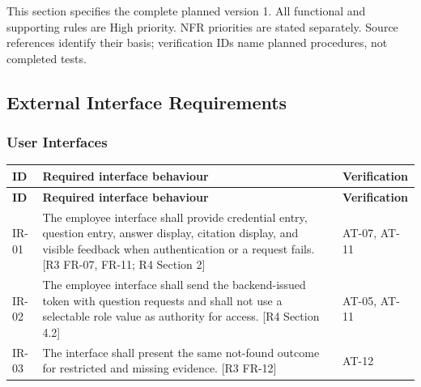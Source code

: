 \documentclass[11pt,letterpaper]{article}
\begin{document}
This section specifies the complete planned version 1. All functional and supporting rules are High priority. NFR priorities are stated separately. Source references identify their basis; verification IDs name planned procedures, not completed tests.\par

\subsection{External Interface Requirements}

\subsubsection{User Interfaces}

\begingroup\small

\begin{longtable}{|P{\arrayrulewidth\relax}|P{\arrayrulewidth\relax}|P{\arrayrulewidth\relax}|}

\hline{}

\textbf{ID} & \textbf{Required interface behaviour} & \textbf{Verification} \\ \hline

\endfirsthead

\hline{}

\textbf{ID} & \textbf{Required interface behaviour} & \textbf{Verification} \\ \hline

\endhead

\hline\endfoot

\hline\endlastfoot

IR-01 & The employee interface shall provide credential entry, question entry, answer display, citation display, and visible feedback when authentication or a request fails. [R3 FR-07, FR-11; R4 Section 2] & AT-07, AT-11 \\ \hline

IR-02 & The employee interface shall send the backend-issued token with question requests and shall not use a selectable role value as authority for access. [R4 Section 4.2] & AT-05, AT-11 \\ \hline

IR-03 & The interface shall present the same not-found outcome for restricted and missing evidence. [R3 FR-12] & AT-12 \\ \hline

\end{longtable}
\end{document}
